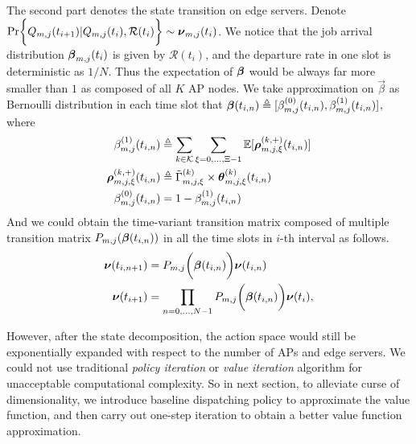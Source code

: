 The second part denotes the state transition on edge servers.
Denote $\Pr\Brace{ Q_{m,j}(t_{i+1})|Q_{m,j}(t_{i}), \mathcal{R}(t_{i}) } \sim \vecG{\nu}_{m,j}(t_i)$. We notice that the job arrival distribution $\boldsymbol{\beta}_{m,j}(t_{i})$ is given by $\mathcal{R}(t_{i})$, and the departure rate in one slot is deterministic as $1/N$.
Thus the expectation of $\boldsymbol{\beta}$ would be always far more smaller than $1$ as composed of all $K$ AP nodes.
We take approximation on $\vec{\beta}$ as Bernoulli distribution in each time slot that $\boldsymbol{\beta}(t_{i,n}) \triangleq [\beta^{(0)}_{m,j}(t_{i,n}), \beta^{(1)}_{m,j}(t_{i,n})]$, where
\begin{align}
    \beta^{(1)}_{m,j}(t_{i,n}) &\triangleq \sum_{k\in\mathcal{K}} \sum_{\xi=0,\dots,\Xi-1} \mathbb{E}[\boldsymbol{\rho}^{(k,+)}_{m,j,\xi}(t_{i,n})]
    \label{eqn_0}
    \\
    \boldsymbol{\rho}^{(k,+)}_{m,j,\xi}(t_{i,n}) &\triangleq \tilde{\Gamma}^{(k)}_{m,j,\xi} \times \boldsymbol{\theta}^{(k)}_{m,j,\xi}(t_{i,n})
    \\
    \beta^{(0)}_{m,j}(t_{i,n}) &= 1-\beta^{(1)}_{m,j}(t_{i,n})
\end{align}
And we could obtain the time-variant transition matrix composed of multiple transition matrix $P_{m,j}(\boldsymbol{\beta}(t_{i,n}))$ in all the time slots in $i$-th interval as follows.
\begin{align}
    \boldsymbol{\nu}(t_{i,n+1}) &= P_{m,j}\bigg(\boldsymbol{\beta}(t_{i,n})\bigg) \boldsymbol{\nu}(t_{i,n})
    \\
    \boldsymbol{\nu}(t_{i+1}) &= \prod_{n=0,\dots,N-1} P_{m,j}\bigg(\boldsymbol{\beta}(t_{i,n})\bigg) \boldsymbol{\nu}(t_{i}),
    \label{eqn_4}
\end{align}

However, after the state decomposition, the action space would still be exponentially expanded with respect to the number of APs and edge servers. We could not use traditional \emph{policy iteration} or \emph{value iteration} algorithm \cite{sutton1998introduction} for unacceptable computational complexity.
So in next section, to alleviate curse of dimensionality, we introduce baseline dispatching policy to approximate the value function, and then carry out one-step iteration to obtain a better value function approximation.
